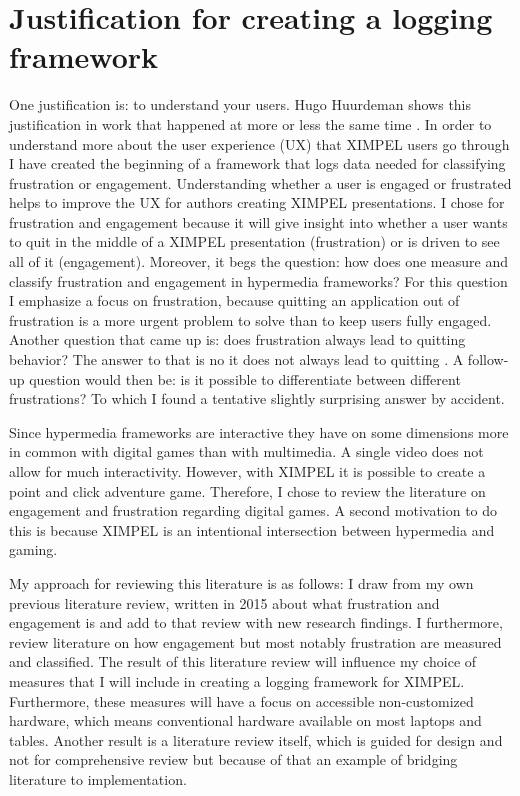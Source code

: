 \section{Justification for creating a logging framework}
One justification is: to understand your users. Hugo Huurdeman shows this justification in work that happened at more or less the same time \cite{ximpel_norway_first_article}. In order to understand more about the user experience (UX) that XIMPEL users go through I have created the beginning of a framework that logs data needed for classifying frustration or engagement. Understanding whether a user is engaged or frustrated helps to improve the UX for authors creating XIMPEL presentations. I chose for frustration and engagement because it will give insight into whether a user wants to quit in the middle of a XIMPEL presentation (frustration) or is driven to see all of it (engagement). Moreover, it begs the question: how does one measure and classify frustration and engagement in hypermedia frameworks? For this question I emphasize a focus on frustration, because quitting an application out of frustration is a more urgent problem to solve than to keep users fully engaged. Another question that came up is: does frustration always lead to quitting behavior? The answer to that is no it does not always lead to quitting \cite{roest2015}. A follow-up question would then be: is it possible to differentiate between different frustrations? To which I found a tentative slightly surprising answer by accident.

Since hypermedia frameworks are interactive they have on some dimensions more in common with digital games than with multimedia. A single video does not allow for much interactivity. However, with XIMPEL it is possible to create a point and click adventure game. Therefore, I chose to review the literature on engagement and frustration regarding digital games. A second motivation to do this is because XIMPEL is an intentional intersection between hypermedia and gaming.

My approach for reviewing this literature is as follows: I draw from my own previous literature review, written in 2015 about what frustration and engagement is and add to that review with new research findings. I furthermore, review literature on how engagement but most notably frustration are measured and classified. 
The result of this literature review will influence my choice of measures that I will include in creating a logging framework for XIMPEL. Furthermore, these measures will have a focus on accessible non-customized hardware, which means conventional hardware available on most laptops and tables. Another result is a literature review itself, which is guided for design and not for comprehensive review but because of that an example of bridging literature to implementation.

